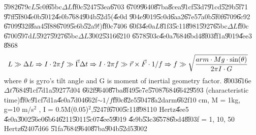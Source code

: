 \U{5982}\U{679c}$L$\U{5c0f}\U{65bc}$\Delta L$\U{ff0c}\U{5247}\U{53ea}\U{6703}%
\U{6709}\U{9640}\U{87ba}\U{8cea}\U{91cf}\U{53d7}\U{91cd}\U{529b}\U{5f71}%
\U{97ff}\U{5f80}\U{4e0b}\U{5012}\U{4e0b}\U{7684}\U{904b}\U{52d5}(\U{4e0d}%
\U{904e}\U{9019}\U{5c0d}\U{6aa2}\U{67e5}\U{7a0b}\U{5f0f}\U{6709}\U{6c92}%
\U{6709}\U{932f}\U{8aa4}\U{5f88}\U{6709}\U{5e6b}\U{52a9}!)\U{ff0c}\U{7406}%
\U{60f3}\U{4e0a}$L$\U{81f3}\U{5c11}\U{8981}\U{5927}\U{65bc}$\Delta L$\U{ff0c}%
\U{6700}\U{597d}$L$\U{5927}\U{5927}\U{65bc}$\Delta L$\U{3002}\U{5316}\U{6210}%
\U{6578}\U{503c}\U{4e0a}\U{7684}\U{6bd4}\U{8f03}\U{ff1a}\U{9019}\U{4ee3}%
\U{8868}%
\begin{equation*}
L\gg \Delta L\Rightarrow I\cdot 2\pi f\gg \vec{\Gamma}\Delta t\Rightarrow
I\cdot 2\pi f\gg \vec{r}\times \vec{F}\cdot 1/f\Rightarrow f\gg \sqrt{\frac{%
arm\cdot Mg\cdot \sin (\theta )}{2\pi I\cdot G}}
\end{equation*}%
where $\theta $ is gyro's tilt angle and G is moment of inertial geometry
factor. \U{8003}\U{616e}$\Delta t$\U{7684}\U{91cf}\U{7d1a}\U{5927}\U{7d04}%
\U{662f}\U{9640}\U{87ba}\U{8f49}\U{5e7e}\U{5708}\U{7684}\U{6642}\U{9593}%
(characteristic time)\U{ff0c}\U{91cf}\U{7d1a}\U{4e0a}\U{7d04}\U{662f}$\sim
1/f$\U{ff0c}\U{82e5}\U{5047}\U{8a2d}arm\U{662f}10 cm, M = 1kg, g=10 m/s$^{2}$%
, I = 0.5M(0.05)$^{2}$,\U{5247}f\U{6700}\U{5c11}\U{8981}10 Hertz\U{4ee5}%
\U{4e0a}\U{3002}\U{56e0}\U{6b64}\U{6211}\U{5011}\U{5c07}\U{4ee5}\U{9019}%
\U{4e9b}\U{53c3}\U{6578}\U{6bd4}\U{8f03}f = 1, 10, 50 Hertz\U{6240}\U{7d66}%
\U{51fa}\U{7684}\U{9640}\U{87ba}\U{904b}\U{52d5}\U{3002}

%

